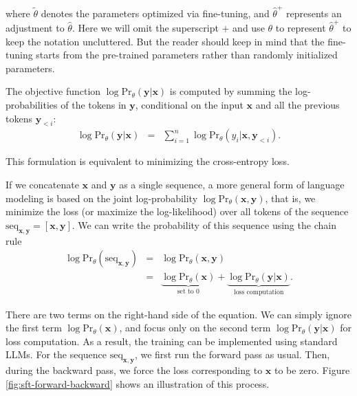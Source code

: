 \noindent where $\tilde{\theta}$ denotes the parameters optimized via fine-tuning, and $\hat{\theta}^+$ represents an adjustment to $\hat{\theta}$. Here we will omit the superscript $+$ and use $\theta$ to represent $\hat{\theta}^+$ to keep the notation uncluttered. But the reader should keep in mind that the fine-tuning starts from the pre-trained parameters rather than randomly initialized parameters.

The objective function $\log \mathrm{Pr}_{\theta}(\mathbf{y}|\mathbf{x})$ is computed by summing the log-probabilities of the tokens in $\mathbf{y}$, conditional on the input $\mathbf{x}$ and all the previous tokens $\mathbf{y}_{<i}$:
\begin{eqnarray}
\log \mathrm{Pr}_{\theta}(\mathbf{y}|\mathbf{x}) & = & \sum_{i=1}^{n} \log \mathrm{Pr}_{\theta}(y_i|\mathbf{x},\mathbf{y}_{<i}).
\end{eqnarray}

\noindent This formulation is equivalent to minimizing the cross-entropy loss.

If we concatenate $\mathbf{x}$ and $\mathbf{y}$ as a single sequence, a more general form of language modeling is based on the joint log-probability $\log \mathrm{Pr}_{\theta}(\mathbf{x},\mathbf{y})$, that is, we minimize the loss (or maximize the log-likelihood) over all tokens of the sequence $\mathrm{seq}_{\mathbf{x},\mathbf{y}} = [\mathbf{x},\mathbf{y}]$. We can write the probability of this sequence using the chain rule
\begin{eqnarray}
\log \mathrm{Pr}_{\theta}(\mathrm{seq}_{\mathbf{x},\mathbf{y}}) & = & \log \mathrm{Pr}_{\theta}(\mathbf{x},\mathbf{y}) \nonumber \\
 & = & \underbrace{\log \mathrm{Pr}_{\theta}(\mathbf{x})}_{\text{set to $0$}} + \underbrace{\log \mathrm{Pr}_{\theta}(\mathbf{y}|\mathbf{x})}_{\text{loss computation}}. \label{eq:sft-xy-chain-rule}
\end{eqnarray}

\noindent There are two terms on the right-hand side of the equation. We can simply ignore the first term $\log \mathrm{Pr}_{\theta}(\mathbf{x})$, and focus only on the second term $\log \mathrm{Pr}_{\theta}(\mathbf{y}|\mathbf{x})$ for loss computation. As a result, the training can be implemented using standard LLMs. For the sequence $\mathrm{seq}_{\mathbf{x},\mathbf{y}}$, we first run the forward pass as usual. Then, during the backward pass, we force the loss corresponding to $\mathbf{x}$ to be zero. Figure \ref{fig:sft-forward-backward} shows an illustration of this process.

